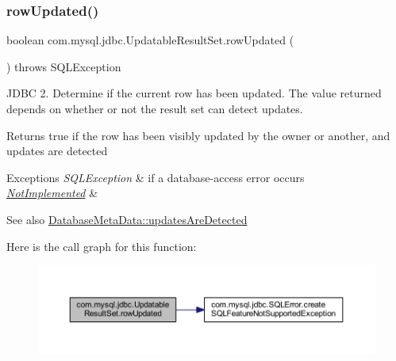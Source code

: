 \subsubsection{\texorpdfstring{row\+Updated()}{rowUpdated()}}
{\footnotesize\ttfamily boolean com.\+mysql.\+jdbc.\+Updatable\+Result\+Set.\+row\+Updated (\begin{DoxyParamCaption}{ }\end{DoxyParamCaption}) throws S\+Q\+L\+Exception}

J\+D\+BC 2. Determine if the current row has been updated. The value returned depends on whether or not the result set can detect updates.

\begin{DoxyReturn}{Returns}
true if the row has been visibly updated by the owner or another, and updates are detected
\end{DoxyReturn}

\begin{DoxyExceptions}{Exceptions}
{\em S\+Q\+L\+Exception} & if a database-\/access error occurs \\
\hline
{\em \mbox{\hyperlink{classcom_1_1mysql_1_1jdbc_1_1_not_implemented}{Not\+Implemented}}} & \\
\hline
\end{DoxyExceptions}
\begin{DoxySeeAlso}{See also}
\mbox{\hyperlink{classcom_1_1mysql_1_1jdbc_1_1_database_meta_data_a59dee4ec20a09deed13ec6efcbe5a0dd}{Database\+Meta\+Data\+::updates\+Are\+Detected}} 
\end{DoxySeeAlso}
Here is the call graph for this function\+:
\nopagebreak
\begin{figure}[H]
\begin{center}
\leavevmode
\includegraphics[width=350pt]{classcom_1_1mysql_1_1jdbc_1_1_updatable_result_set_a220d6c10abf185de3588e99132f5f68f_cgraph}
\end{center}
\end{figure}
\mbox{\label{classcom_1_1mysql_1_1jdbc_1_1_updatable_result_set_ab0dbcb7c08c1f009f8bbfdce7e41158c}} 
